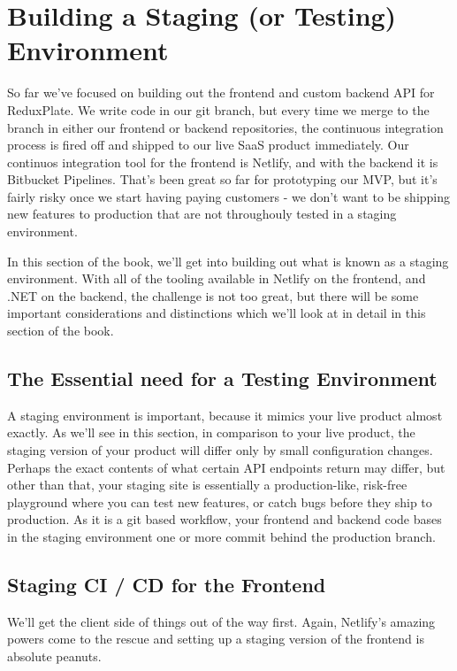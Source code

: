 \documentclass[a4paper,headinclude=on,footinclude=on,12pt,oneside]{scrbook}
\begin{document}
\chapter{Building a Staging (or Testing) Environment}

So far we've focused on building out the frontend and custom backend API for ReduxPlate. We write code in our  git branch, but every time we merge to the  branch in either our frontend or backend repositories, the continuous integration process is fired off and shipped to our live SaaS product immediately. Our continuos integration tool for the frontend is Netlify, and with the backend it is Bitbucket Pipelines. That's been great so far for prototyping our MVP, but it's fairly risky once we start having paying customers - we don't want to be shipping new features to production that are not throughouly tested in a staging environment.

In this section of the book, we'll get into building out what is known as a staging environment. With all of the tooling available in Netlify on the frontend, and .NET on the backend, the challenge is not too great, but there will be some important considerations and distinctions which we'll look at in detail in this section of the book.

\section{The Essential need for a Testing Environment}

A staging environment is important, because it mimics your live product almost exactly. As we'll see in this section, in comparison to your live product, the staging version of your product will differ only by small configuration changes. Perhaps the exact contents of what certain API endpoints return may differ, but other than that, your staging site is essentially a production-like, risk-free playground where you can test new features, or catch bugs before they ship to production. As it is a git based workflow, your frontend and backend code bases in the staging environment one or more commit behind the production branch.

\section{Staging CI / CD for the Frontend}

We'll get the client side of things out of the way first. Again, Netlify's amazing powers come to the rescue and setting up a staging version of the frontend is absolute peanuts. 
\end{document}
